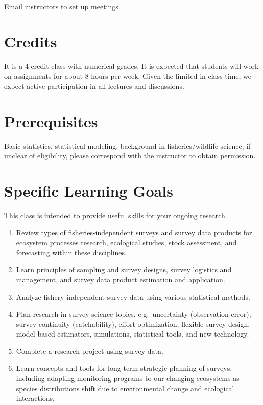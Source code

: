 \documentclass[
  letterpaper,
  oneside,
  open=any]{scrbook}
\providecommand{\tightlist}{%
  \setlength{\itemsep}{0pt}\setlength{\parskip}{0pt}}\usepackage{longtable,booktabs,array}
\begin{document}
Email instructors to set up meetings.

\section{Credits}\label{credits}

It is a 4-credit class with numerical grades. It is expected that
students will work on assignments for about 8 hours per week. Given the
limited in-class time, we expect active participation in all lectures
and discussions.

\section{Prerequisites}\label{prerequisites}

Basic statistics, statistical modeling, background in fisheries/wildlife
science; if unclear of eligibility, please correspond with the
instructor to obtain permission.

\section{Specific Learning Goals}\label{specific-learning-goals}

This class is intended to provide useful skills for your ongoing
research.

\begin{enumerate}
\def\labelenumi{\arabic{enumi}.}
\tightlist
\item
  Review types of fisheries-independent surveys and survey data products
  for ecosystem processes research, ecological studies, stock
  assessment, and forecasting within these disciplines.
\item
  Learn principles of sampling and survey designs, survey logistics and
  management, and survey data product estimation and application.
\item
  Analyze fishery-independent survey data using various statistical
  methods.
\item
  Plan research in survey science topics, e.g.~uncertainty (observation
  error), survey continuity (catchability), effort optimization,
  flexible survey design, model-based estimators, simulations,
  statistical tools, and new technology.
\item
  Complete a research project using survey data.
\item
  Learn concepts and tools for long-term strategic planning of surveys,
  including adapting monitoring programs to our changing ecosystems as
  species distributions shift due to environmental change and ecological
  interactions.
\end{enumerate}
\end{document}
